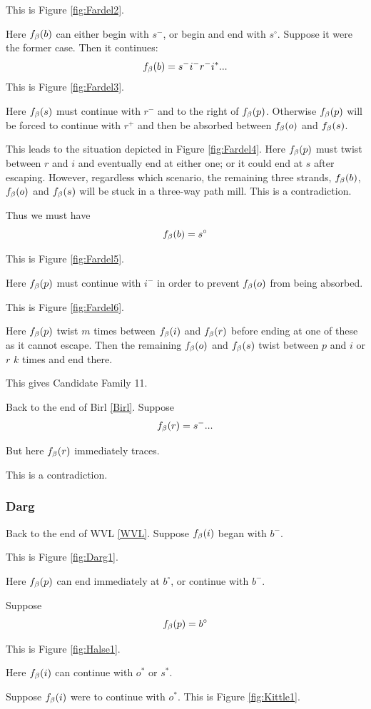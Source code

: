 This is Figure \ref{fig:Fardel2}.

Here $f_\beta(b)$ can either begin with $s^-$, or begin and end with $s^\circ$. Suppose it were the former case. Then it continues:
$$f_\beta(b) = s^- i^- r^- i^*...$$
This is Figure \ref{fig:Fardel3}.

Here $f_\beta(s)$ must continue with $r^-$ and to the right of $f_\beta(p)$. Otherwise $f_\beta(p)$ will be forced to continue with $r^+$ and then be absorbed between $f_\beta(o)$ and $f_\beta(s)$.

This leads to the situation depicted in Figure \ref{fig:Fardel4}. Here $f_\beta(p)$ must twist between $r$ and $i$ and eventually end at either one; or it could end at $s$ after escaping. However, regardless which scenario, the remaining three strands, $f_\beta(b)$, $f_\beta(o)$ and $f_\beta(s)$ will be stuck in a three-way path mill. This is a contradiction.

Thus we must have
$$f_\beta(b) = s^\circ$$

This is Figure \ref{fig:Fardel5}.

Here $f_\beta(p)$ must continue with $i^-$ in order to prevent $f_\beta(o)$ from being absorbed. 

This is Figure \ref{fig:Fardel6}.

Here $f_\beta(p)$ twist $m$ times between $f_\beta(i)$ and $f_\beta(r)$ before ending at one of these as it cannot escape. Then the remaining $f_\beta(o)$ and $f_\beta(s)$ twist between $p$ and $i$ or $r$ $k$ times and end there.

This gives Candidate Family 11.

Back to the end of Birl \ref{Birl}. Suppose 
$$f_\beta(r) = s^-...$$

But here $f_\beta(r)$ immediately traces.

This is a contradiction.

\subsubsection{Darg}\label{Darg}
Back to the end of WVL \ref{WVL}. Suppose $f_\beta(i)$ began with $b^-$. 

This is Figure \ref{fig:Darg1}.

Here $f_\beta(p)$ can end immediately at $b^\circ$, or continue with $b^-$.

\label{Halse}
Suppose 
$$f_\beta(p) = b^\circ$$

This is Figure \ref{fig:Halse1}.

Here $f_\beta(i)$ can continue with $o^*$ or $s^*$.

\label{Kittle}
Suppose $f_\beta(i)$ were to continue with $o^*$. This is Figure \ref{fig:Kittle1}.

